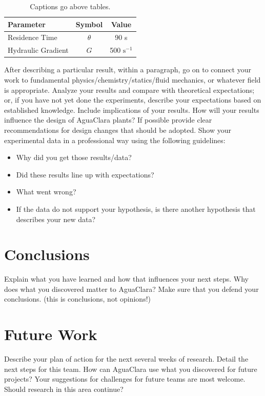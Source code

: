 \documentclass[a4paper]{article}
\begin{document}
\begin{table}[H]
\centering
\caption{Captions go above tables.}
\begin{tabular}{| l | c | c |}
\hline
Parameter & Symbol & Value \\ \hline
Residence Time & $\theta$ & 90 s \\ \hline
Hydraulic Gradient & $G$ & 500 $\mathrm{s^{-1}}$ \\
\hline
\end{tabular}
\label{Table}
\end{table}

After describing a particular result, within a paragraph, go on to connect your work to fundamental physics/chemistry/statics/fluid mechanics, or whatever field is appropriate. Analyze your results and compare with theoretical expectations; or, if you have not yet done the experiments, describe your expectations based on established knowledge. Include implications of your results. How will your results influence the design of AguaClara plants? If possible provide clear recommendations for design changes that should be adopted. Show your experimental data in a professional way using the following guidelines:
\begin{itemize}
\item Why did you get those results/data?
\item Did these results line up with expectations?
\item What went wrong?
\item If the data do not support your hypothesis, is there another hypothesis that describes your new data?
\end{itemize}

\section*{Conclusions}
Explain what you have learned and how that influences your next steps. Why does what you discovered matter to AguaClara?
Make sure that you defend your conclusions. (this is conclusions, not opinions!)


\section*{Future Work}
Describe your plan of action for the next several weeks of research. Detail the next steps for this team. How can AguaClara use what you discovered for future projects? Your suggestions for challenges for future teams are most welcome. Should research in this area continue?
\end{document}
